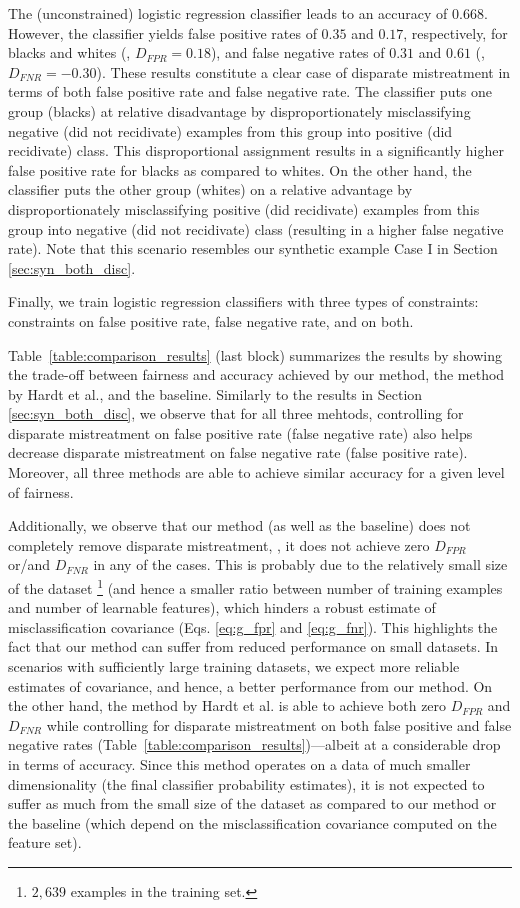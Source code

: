 \documentclass[letterpaper]{sig-alternate-2013}
\newcommand{\xhdr}[1]{\vspace{0.5mm}\noindent{{\bf #1.}}}
\newcommand{\disc}{disparate mistreatment}
\begin{document}
The (unconstrained) logistic regression classifier leads to an accuracy of $0.668$.
However, the classifier yields  false positive rates of $0.35$ and $0.17$, respectively, for  blacks and whites (\ie, $D_{FPR} = 0.18$), and false negative rates of $0.31$ and $0.61$ (\ie, $D_{FNR} = -0.30$).
These results constitute a clear case of \disc{} in terms of both false positive rate and false negative rate.
The classifier puts one  group (blacks) at relative disadvantage  by disproportionately misclassifying negative (did not recidivate) examples from this group into positive (did recidivate) class. This disproportional assignment results in a significantly higher false positive rate for blacks as compared to whites. On the other hand, the classifier puts the other group (whites) on a relative advantage by disproportionately misclassifying positive (did recidivate) examples from this group into negative (did not recidivate) class (resulting in a higher false negative rate).
Note that this scenario resembles our synthetic example Case I in Section \ref{sec:syn_both_disc}.


Finally, we train logistic regression classifiers with three types of constraints: constraints on false positive rate, false negative rate, and on both.

\vspace{1.5mm}
\xhdr{Results}
Table~\ref{table:comparison_results} (last block) summarizes the results by showing the trade-off between fairness and accuracy achieved by our method, the method by Hardt et al., and the baseline.
Similarly to the results in Section \ref{sec:syn_both_disc}, we observe that for all three mehtods, controlling for \disc{} on false positive rate (false negative rate) also helps decrease \disc{} on false negative rate (false positive rate). Moreover, all three methods are able to
achieve similar accuracy for a given level of fairness.

Additionally, we observe that our method (as well as the baseline) does not completely remove \disc{}, \ie, it does not achieve zero $D_{FPR} $ or/and $D_{FNR} $ in any of the cases.
This is probably due to the relatively small size of the dataset
\footnote{
\scriptsize{$2,639$ examples in the training set.}
}
(and hence a smaller ratio between number of training examples and number of learnable features), which hinders a
robust estimate of misclassification covariance (Eqs. \ref{eq:g_fpr} and \ref{eq:g_fnr}). This highlights the fact that our
method can suffer from reduced performance on small datasets.
In scenarios with sufficiently large training datasets, we expect more reliable estimates of covariance, and hence, a better
performance from our method.
On the other hand, the method by Hardt et al. is able to achieve both zero $D_{FPR} $ and $D_{FNR} $ while controlling for
\disc{} on both false positive and false negative rates (Table~\ref{table:comparison_results})---albeit at a considerable drop
in terms of accuracy. Since this method operates on a data of much smaller dimensionality (the final classifier probability estimates),
it is not expected to suffer as much from the small size of the dataset as compared to our method or the baseline (which depend
on the misclassification covariance computed on the feature set).
\end{document}
